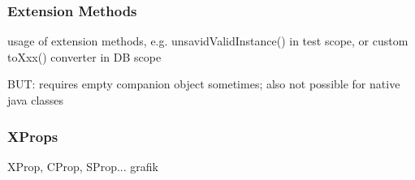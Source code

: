 


\begin{frame}\frametitle{Extension Methods}
\pause

usage of extension methods, e.g. unsavidValidInstance() in test scope, or custom toXxx() converter in DB scope

BUT: requires empty companion object sometimes; also not possible for native java classes
\end{frame}


\begin{frame}\frametitle{XProps}
\pause

XProp, CProp, SProp... grafik
\end{frame}
